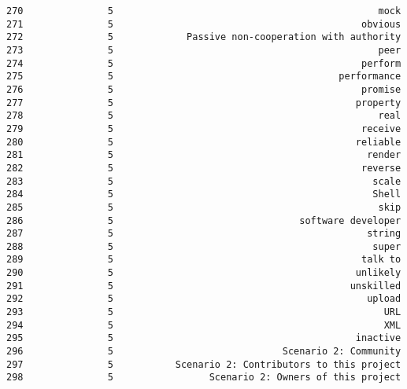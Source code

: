 \documentclass[11pt]{article}
\begin{document}
\begin{Verbatim}[commandchars=\\\{\}]
270               5                                               mock   
271               5                                            obvious   
272               5             Passive non-cooperation with authority   
273               5                                               peer   
274               5                                            perform   
275               5                                        performance   
276               5                                            promise   
277               5                                           property   
278               5                                               real   
279               5                                            receive   
280               5                                           reliable   
281               5                                             render   
282               5                                            reverse   
283               5                                              scale   
284               5                                              Shell   
285               5                                               skip   
286               5                                 software developer   
287               5                                             string   
288               5                                              super   
289               5                                            talk to   
290               5                                           unlikely   
291               5                                          unskilled   
292               5                                             upload   
293               5                                                URL   
294               5                                                XML   
295               5                                           inactive   
296               5                              Scenario 2: Community   
297               5           Scenario 2: Contributors to this project   
298               5                 Scenario 2: Owners of this project   


\end{Verbatim}
\end{document}
